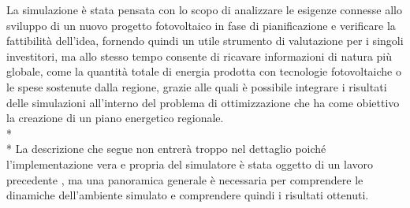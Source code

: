 \documentclass[12pt,a4paper,openright,twoside]{report}
\begin{document}
La simulazione è stata pensata con lo scopo di analizzare le esigenze connesse allo sviluppo di un nuovo progetto  fotovoltaico in fase di pianificazione e verificare la fattibilità dell'idea, fornendo quindi un utile strumento di valutazione per i singoli investitori, ma allo stesso tempo consente di ricavare informazioni di natura più globale, come la quantità totale di energia prodotta con tecnologie fotovoltaiche o le spese sostenute dalla regione, grazie alle quali è possibile integrare i risultati delle simulazioni all'interno del problema di ottimizzazione che ha come obiettivo la creazione di un piano energetico regionale.\\* \\*
La descrizione che segue non entrerà troppo nel dettaglio poiché l'implementazione vera e propria del simulatore è stata oggetto di un lavoro precedente \cite{tesiCroce}, ma una panoramica generale è necessaria per comprendere le dinamiche dell'ambiente simulato e comprendere quindi i risultati ottenuti.
\end{document}
